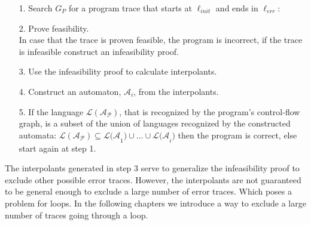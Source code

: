 \documentclass{article}
\begin{document}
\begin{itemize}
    \item[1.] Search $G_P$ for a program trace that starts at $\ell_{init}$ and ends in $\ell_{err}$:
    \begin{figure}[H]
        \centering
    \end{figure}
        \item[2.] Prove feasibility. \\ In case that the trace is proven feasible, the program is incorrect, if the trace is infeasible construct an infeasibility proof.
        \item[3.] Use the infeasibility proof to calculate interpolants.
        \item[4.] Construct an automaton, $\mathcal{A}_i$, from the interpolants.
        \item[5.] If the language $\mathcal{L(A_P)}$, that is recognized by the program's control-flow graph, is a subset of the union of languages recognized by the constructed automata: $\mathcal{L(A_P)} \subseteq \mathcal{L(A}_1) \cup ... \cup \mathcal{L(A}_i)$ then the program is correct, else start again at step 1.
    \end{itemize}
    The interpolants generated in step 3 serve to generalize the infeasibility proof to exclude other possible error traces. However, the interpolants are not guaranteed to be general enough to exclude a large number of error traces. Which poses a problem for loops. In the following chapters we introduce a way to exclude a large number of traces going through a loop.
\end{document}
